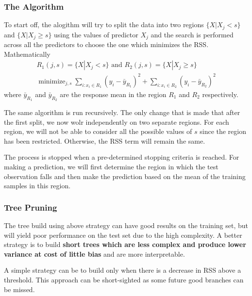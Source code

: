 \documentclass[11pt, a4paper]{article}
\DeclareMathOperator*{\minimize}{minimize}
\begin{document}
    \subsubsection{The Algorithm}
    To start off, the alogithm will try to split the data into two regions $\{X|X_{j} < s\}$ and $\{X|X_{j} \geq s\}$ using the values of predictor $X_{j}$ and the search is performed across all the predictors to choose the one which minimizes the RSS. Mathematically
    \begin{align*}
        R_{1}(j,s) = \{X|X_{j} < s\} \text{ and } R_{2}(j,s) = \{X|X_{j} \geq s\}\\
        \minimize_{j, s} \sum_{i:x_{i} \in R_{1}} (y_{i} - \bar{y}_{R_{1}})^{2} + \sum_{i:x_{i} \in R_{2}} (y_{i} - \bar{y}_{R_{2}})^{2}
    \end{align*}
    where $\bar{y}_{R_{1}}$ and $\bar{y}_{R_{2}}$ are the response mean in the region $R_{1}$ and $R_{2}$ respectively.\newline

    The same algorithm is run recursively. The only change that is made that after the first split, we now wolr independently on two separate regions. For each region, we will not be able to consider all the possible values of $s$ since the region has been restricted. Otherwise, the RSS term will remain the same.\newline

    The process is stopped when a pre-determined stopping criteria is reached. For making a prediction, we will first determine the region in which the test observation falls and then make the prediction based on the mean of the training samples in this region.


    \subsubsection{Tree Pruning}
    The tree build using above strategy can have good results on the training set, but will yield poor performance on the test set due to the high complexity. A better strategy is to build \textbf{short trees which are less complex and produce lower variance at cost of little bias} and are more interpretable.\newline

    A simple strategy can be to build only when there is a decrease in RSS above a threshold. This approach can be short-sighted as some future good branches can be missed.\newline
\end{document}
